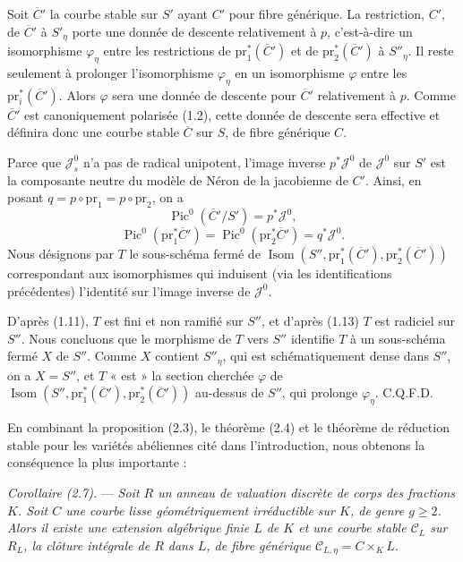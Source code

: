 \documentclass[10pt]{article}
\newcommand{\Isom}{\operatorname{Isom}}
\newcommand{\Pic}{\operatorname{Pic}}
\begin{document}
Soit $\overline C'$ la courbe stable sur $S'$ ayant $C'$ pour fibre générique. La restriction, $C'$, de $\overline C'$ à $S'_\eta$ porte une donnée de descente relativement à $p$, c'est-à-dire un isomorphisme $\varphi_\eta$ entre les restrictions de $\mathrm{pr}_1^*(\overline C')$ et de $\mathrm{pr}_2^*(\overline C')$ à $S''_\eta$. Il reste seulement à prolonger l'isomorphisme $\varphi_\eta$ en un isomorphisme $\varphi$ entre les $\mathrm{pr}_i^*(\overline C')$. Alors $\varphi$ sera une donnée de descente pour $\overline C'$ relativement à $p$. Comme $\overline C'$ est canoniquement polarisée (1.2), cette donnée de descente sera effective et définira donc une courbe stable $\overline C$ sur $S$, de fibre générique $C$.

Parce que $\mathscr J_s^0$ n'a pas de radical unipotent, l'image inverse $p^*\mathscr J^0$ de $\mathscr J^0$ sur $S'$ est la composante neutre du modèle de Néron de la jacobienne de $C'$. Ainsi, en posant $q=p\circ\mathrm{pr}_1=p\circ\mathrm{pr}_2$, on a
\[
\Pic^0(\overline C'/S')=p^*\mathscr J^0,
\]
\[
\Pic^0(\mathrm{pr}_1^*\overline C')=\Pic^0(\mathrm{pr}_2^*\overline C')=q^*\mathscr J^0.
\]
Nous désignons par $T$ le sous-schéma fermé de $\Isom(S'',\mathrm{pr}_1^*(\overline C'),\mathrm{pr}_2^*(\overline C'))$ correspondant aux isomorphismes qui induisent (via les identifications précédentes) l'identité sur l'image inverse de $\mathscr J^0$.

D'après (1.11), $T$ est fini et non ramifié sur $S''$, et d'après (1.13) $T$ est radiciel sur $S''$. Nous concluons que le morphisme de $T$ vers $S''$ identifie $T$ à un sous-schéma fermé $X$ de $S''$. Comme $X$ contient $S''_\eta$, qui est schématiquement dense dans $S''$, on a $X=S''$, et $T$ « est » la section cherchée $\varphi$ de $\Isom(S'',\mathrm{pr}_1^*(\overline C'),\mathrm{pr}_2^*(\overline C'))$ au-dessus de $S''$, qui prolonge $\varphi_\eta$. C.Q.F.D.

En combinant la proposition (2.3), le théorème (2.4) et le théorème de réduction stable pour les variétés abéliennes cité dans l'introduction, nous obtenons la conséquence la plus importante :

\medskip
\noindent\emph{Corollaire (2.7).} --- \emph{Soit $R$ un anneau de valuation discrète de corps des fractions $K$. Soit $C$ une courbe lisse géométriquement irréductible sur $K$, de genre $g\geq2$. Alors il existe une extension algébrique finie $L$ de $K$ et une courbe stable $\mathscr C_L$ sur $R_L$, la clôture intégrale de $R$ dans $L$, de fibre générique $\mathscr C_{L,\eta}=C\times_K L$.}
\end{document}

